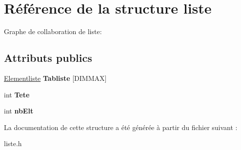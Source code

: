 \hypertarget{structliste}{}\section{Référence de la structure liste}
\label{structliste}


Graphe de collaboration de liste\+:
\subsection*{Attributs publics}
\begin{DoxyCompactItemize}
\item 
\mbox{\label{structliste_a78ae07a2a790f7cde605fdf5419cf67b}} 
\hyperlink{structs__arc__p}{Elementliste} {\bfseries Tabliste} \mbox{[}D\+I\+M\+M\+AX\mbox{]}
\item 
\mbox{\label{structliste_a5aa222084b1384a391d80f0d88bf15c2}} 
int {\bfseries Tete}
\item 
\mbox{\label{structliste_a9d7c35e9a7e1c88555a21254d33a7246}} 
int {\bfseries nb\+Elt}
\end{DoxyCompactItemize}


La documentation de cette structure a été générée à partir du fichier suivant \+:\begin{DoxyCompactItemize}
\item 
liste.\+h\end{DoxyCompactItemize}
